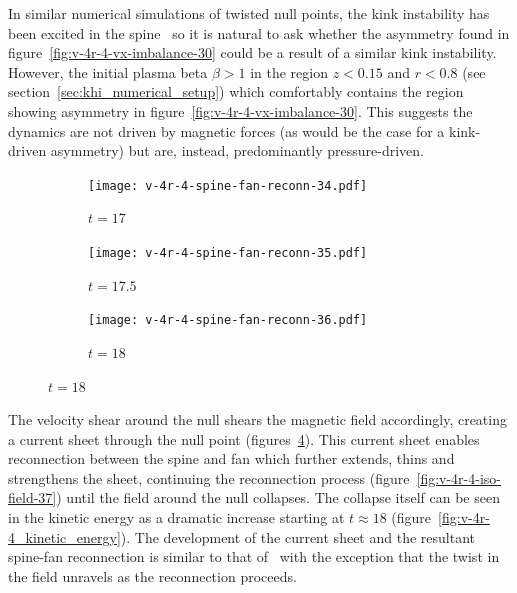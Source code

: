 In similar numerical simulations of twisted null points, the kink instability has been excited in the spine~\cite{pariatModelSolarPolar2009} so it is natural to ask whether the asymmetry found in figure~\ref{fig:v-4r-4-vx-imbalance-30} could be a result of a similar kink instability. However, the initial plasma beta $\beta > 1$ in the region $z < 0.15$ and $r < 0.8$ (see section~\ref{sec:khi_numerical_setup}) which comfortably contains the region showing asymmetry in figure~\ref{fig:v-4r-4-vx-imbalance-30}.  This suggests the dynamics are not driven by magnetic forces (as would be the case for a kink-driven asymmetry) but are, instead, predominantly pressure-driven.

\begin{figure}[t]
  \centering
    \begin{subfigure}{0.32\textwidth}
      \texttt{[image: v-4r-4-spine-fan-reconn-34.pdf]}
      \caption{$t=17$}
      \label{fig:v-4r-4-spine-fan-reconn-34}
    \end{subfigure}
    \hfill
    \begin{subfigure}{0.32\textwidth}
      \texttt{[image: v-4r-4-spine-fan-reconn-35.pdf]}
      \caption{$t=17.5$}
      \label{fig:v-4r-4-spine-fan-reconn-35}
    \end{subfigure}
    \hfill
    \begin{subfigure}{0.32\textwidth}
      \texttt{[image: v-4r-4-spine-fan-reconn-36.pdf]}
      \caption{$t=18$}
      \label{fig:v-4r-4-spine-fan-reconn-36}
    \end{subfigure}
\label{fig:spine_fan_reconnection_current_sheet}
\end{figure}

The velocity shear around the null shears the magnetic field accordingly, creating a current sheet through the null point (figures~\ref{fig:spine_fan_reconnection_current_sheet}). This current sheet enables reconnection between the spine and fan which further extends, thins and strengthens the sheet, continuing the reconnection process (figure~\ref{fig:v-4r-4-iso-field-37}) until the field around the null collapses. The collapse itself can be seen in the kinetic energy as a dramatic increase starting at $t\approx18$ (figure~\ref{fig:v-4r-4_kinetic_energy}). The development of the current sheet and the resultant spine-fan reconnection is similar to that of~\cite{pontinCurrentSheetFormation2007} with the exception that the twist in the field unravels as the reconnection proceeds. 

